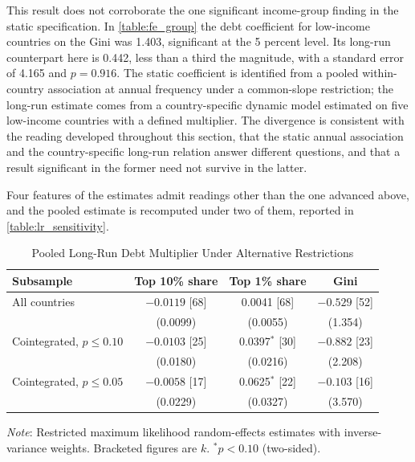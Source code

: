 \documentclass[12pt, titlepage]{article}
\numberwithin{equation}{section}
\begin{document}
This result does not corroborate the one significant income-group finding in
the static specification. In \autoref{table:fe_group} the debt coefficient for
low-income countries on the Gini was 1.403, significant at the 5 percent
level. Its long-run counterpart here is 0.442, less than a third the
magnitude, with a standard error of 4.165 and $p=0.916$. The static
coefficient is identified from a pooled within-country association at annual
frequency under a common-slope restriction; the long-run estimate comes from a
country-specific dynamic model estimated on five low-income countries with a
defined multiplier. The divergence is consistent with the reading developed
throughout this section, that the static annual association and the
country-specific long-run relation answer different questions, and that a
result significant in the former need not survive in the latter.

Four features of the estimates admit readings other than the one advanced
above, and the pooled estimate is recomputed under two of them, reported in
\autoref{table:lr_sensitivity}.

\begin{table}[htbp]
	\centering
	\begin{threeparttable}
		\caption{Pooled Long-Run Debt Multiplier Under Alternative Restrictions}
		\label{table:lr_sensitivity}
		\begin{small}
			\begin{tabular}{lccc}
				\toprule
				\textbf{Subsample} & \textbf{Top 10\% share} & \textbf{Top 1\% share} & \textbf{Gini} \\
				\midrule
				All countries                 & $-0.0119$ [68] & \phantom{$-$}0.0041 [68] & $-0.529$ [52] \\
				& (0.0099) & (0.0055) & (1.354) \\
				\addlinespace
				Cointegrated, $p \leq 0.10$   & $-0.0103$ [25] & \phantom{$-$}0.0397$^{*}$ [30] & $-0.882$ [23] \\
				& (0.0180) & (0.0216) & (2.208) \\
				\addlinespace
				Cointegrated, $p \leq 0.05$   & $-0.0058$ [17] & \phantom{$-$}0.0625$^{*}$ [22] & $-0.103$ [16] \\
				& (0.0229) & (0.0327) & (3.570) \\
				\bottomrule
			\end{tabular}
		\end{small}
		\begin{tablenotes}
			\footnotesize
			\item \emph{Note}: Restricted maximum likelihood random-effects estimates
			with inverse-variance weights. Bracketed figures are $k$.
			$^{*}p<0.10$ (two-sided).
		\end{tablenotes}
	\end{threeparttable}
\end{table}
\end{document}
